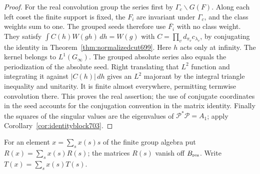 \documentclass[a4paper,11pt]{article}
\theoremstyle{definition}
\theoremstyle{remark}
\numberwithin{equation}{section}
\begin{document}
\begin{proof}
For the real convolution group the series first by
\(\Gamma_c\backslash G(F)\). Along each left coset the finite
support is fixed, the \(F_i\) are invariant under \(\Gamma_c\),
and the class weights sum to one. The grouped seeds therefore
use \(\overline{F_i}\) with no class weight. They satisfy
\(\int C(h)W(gh)\,dh=W(g)\) with
\(C=\prod_v d_{\pi_v}c_{\lambda_v}\), by conjugating the
identity in Theorem~\ref{thm:normalizedcut699}. Here \(h\)
acts only at infinity. The kernel belongs to \(L^1(G_\infty)\).
The grouped absolute series also equals the periodization of
the absolute seed. Right translating that \(L^2\) function
and integrating it against \(|C(h)|\,dh\) gives an \(L^2\)
majorant by the integral triangle inequality and unitarity.
It is finite almost everywhere, permitting termwise
convolution there. This proves the real assertion; the
use of conjugate coordinates in the seed accounts for the
conjugation convention in the matrix identity. Finally the
squares of the singular values are the eigenvalues of
\(\mathcal P^*\mathcal P=A_1\); apply
Corollary~\ref{cor:identityblock703}.
\end{proof}

For an element \(x=\sum_s x(s)s\) of the finite group algebra
put \(R(x)=\sum_s x(s)R(s)\); the matrices \(R(s)\) vanish
off \(B_{\rm res}\). Write \(T(x)=\sum_s x(s)T(s)\).
\end{document}

